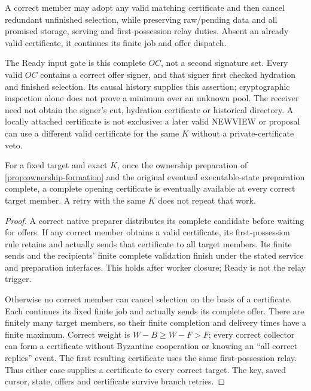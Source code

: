 A correct member may adopt any valid matching certificate and then
cancel redundant unfinished selection, while preserving raw/pending data
and all promised storage, serving and first-possession relay duties.
Absent an already valid certificate, it continues its finite job and
offer dispatch.

The Ready input gate is this complete $\mathit{OC}$, not a second
 signature set. Every valid $\mathit{OC}$ contains a correct
offer signer, and that signer first checked hydration and finished
selection. Its causal history supplies this assertion; cryptographic
inspection alone does not prove a minimum over an unknown pool. The
receiver need not obtain the signer's cut, hydration certificate or
historical directory. A locally attached certificate is not exclusive:
a later valid NEWVIEW or proposal can use a different valid certificate
for the same $K$ without a private-certificate veto.

\begin{proposition}
\label{prop:opening-formation}
For a fixed target and exact $K$, once the ownership preparation of
\cref{prop:ownership-formation} and the original eventual executable-state
preparation complete, a complete opening certificate is eventually
available at every correct target member. A retry with the same $K$
does not repeat that work.
\end{proposition}
\begin{proof}
A correct native preparer distributes its complete candidate before
waiting for offers. If any correct member obtains a valid certificate,
its first-possession rule retains and actually sends that certificate
to all target members. Its finite sends and the recipients' finite
complete validation finish under the stated service and preparation
interfaces. This holds after worker closure; Ready is not the relay
trigger.

Otherwise no correct member can cancel selection on the basis of a
certificate. Each continues its fixed finite job and actually sends its
complete offer. There are finitely many target members, so their finite
completion and delivery times have a finite maximum. Correct weight is
$W-B\ge W-F>F$; every correct collector can form a certificate without
Byzantine cooperation or knowing an ``all correct replies'' event.
The first resulting certificate uses the same first-possession relay.
Thus either case supplies a certificate to every correct target. The key,
saved cursor, state, offers and certificate survive branch retries.
\end{proof}

